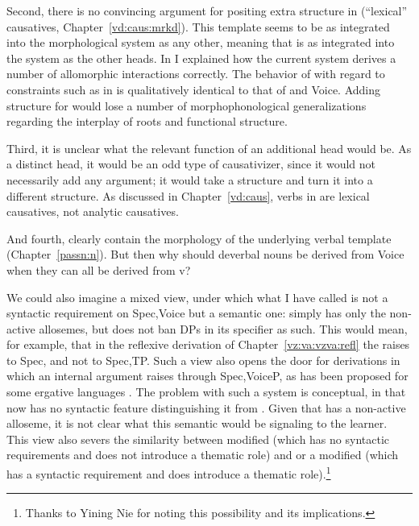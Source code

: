 \begin{exe}
\begin{xlist}
\begin{exe}
\begin{exe}
\begin{xlist}
\begin{exe}
\begin{exe}
\begin{exe}
\begin{exe}
\begin{exe}
\begin{xlist}
\begin{exe}
Second, there is no convincing argument for positing extra structure in {\thif} (``lexical'' causatives, Chapter~\ref{vd:caus:mrkd}). This template seems to be as integrated into the morphological system as any other, meaning that {\vd} is as integrated into the system as the other heads. In \cite{kastner18nllt} I explained how the current system derives a number of allomorphic interactions correctly. The behavior of {\vd} with regard to constraints such as  in  is qualitatively identical to that of {\vz} and Voice. Adding structure for {\thif} would lose a number of morphophonological generalizations regarding the interplay of roots and functional structure.

Third, it is unclear what the relevant function of an additional head would be. As a  distinct  head, it would be an odd type of causativizer, since it would not necessarily add any argument; it would take a  structure and turn it into a different  structure. As discussed in Chapter~\ref{vd:caus},  verbs in {\thif} are lexical causatives, not analytic causatives.

And fourth,  clearly contain the morphology of the underlying verbal template (Chapter~\ref{passn:n}). But then why should deverbal nouns be derived from Voice when they can all be derived from v?

We could also imagine a mixed view, under which what I have called {\vz} is not a syntactic requirement on Spec,Voice but a semantic one: {\vz} simply has only the non-active allosemes, but does not ban DPs in its specifier as such. This would mean, for example, that in the reflexive derivation of Chapter~\ref{vz:va:vzva:refl} the  raises to Spec,{\vz} and not to Spec,TP. Such a view also opens the door for derivations in which an internal argument raises through Spec,VoiceP, as has been proposed for some ergative languages \citep{deal19li}. The problem with such a system is conceptual, in that {\vz} now has no syntactic feature distinguishing it from . Given that  has a non-active alloseme, it is not clear what this semantic {\vz} would be signaling to the learner. This view also severs the similarity between modified {\vz} (which has no syntactic requirements and does not introduce a thematic role) and {\pz} or a modified {\pz} (which has a syntactic requirement and does introduce a thematic role).\footnote{Thanks to Yining Nie for noting this possibility and its implications.}


\end{exe}
\end{xlist}
\end{exe}
\end{exe}
\end{exe}
\end{exe}
\end{exe}
\end{xlist}
\end{exe}
\end{exe}
\end{xlist}
\end{exe}
